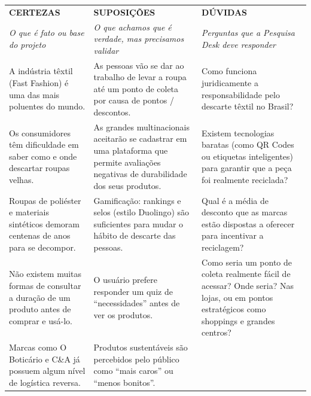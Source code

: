 \documentclass[12pt, a4paper]{article}
\begin{document}
\renewcommand{\arraystretch}{1.4}
\begingroup
\small
\begin{xltabular}{\textwidth}{!{\color{oliveSoft}\vrule}X!{\color{oliveSoft}\vrule}X!{\color{oliveSoft}\vrule}X!{\color{oliveSoft}\vrule}}
\hline
{}\\ \hline
{}
\centering\textbf{CERTEZAS} & \centering\textbf{SUPOSIÇÕES} & \centering\arraybackslash\textbf{DÚVIDAS} \\
\centering\footnotesize\textit{O que é fato ou base do projeto} & \centering\footnotesize\textit{O que achamos que é verdade, mas precisamos validar} & \centering\arraybackslash\footnotesize\textit{Perguntas que a Pesquisa Desk deve responder} \\ \hline
\endhead
A indústria têxtil (Fast Fashion) é uma das mais poluentes do mundo.
& As pessoas vão se dar ao trabalho de levar a roupa até um ponto de coleta por causa de pontos / descontos.
& Como funciona juridicamente a responsabilidade pelo descarte têxtil no Brasil? \\ \hline
Os consumidores têm dificuldade em saber como e onde descartar roupas velhas.
& As grandes multinacionais aceitarão se cadastrar em uma plataforma que permite avaliações negativas de durabilidade dos seus produtos.
& Existem tecnologias baratas (como QR Codes ou etiquetas inteligentes) para garantir que a peça foi realmente reciclada? \\ \hline
Roupas de poliéster e materiais sintéticos demoram centenas de anos para se decompor.
& Gamificação: rankings e selos (estilo Duolingo) são suficientes para mudar o hábito de descarte das pessoas.
& Qual é a média de desconto que as marcas estão dispostas a oferecer para incentivar a reciclagem? \\ \hline
Não existem muitas formas de consultar a duração de um produto antes de comprar e usá-lo.
& O usuário prefere responder um quiz de ``necessidades'' antes de ver os produtos.
& Como seria um ponto de coleta realmente fácil de acessar? Onde seria? Nas lojas, ou em pontos estratégicos como shoppings e grandes centros? \\ \hline
Marcas como O Boticário e C\&A já possuem algum nível de logística reversa.
& Produtos sustentáveis são percebidos pelo público como ``mais caros'' ou ``menos bonitos''.
& \\ \hline
\end{xltabular}
\endgroup
\end{document}
